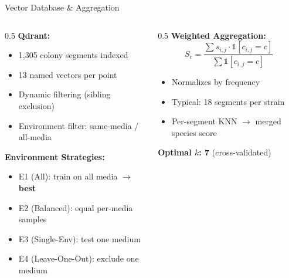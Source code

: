 \documentclass[aspectratio=169]{beamer}
\begin{document}
\begin{frame}{Vector Database \& Aggregation}
  \begin{columns}[T]
    \begin{column}{0.5\textwidth}
      \textbf{Qdrant:}
      \begin{itemize}
        \item 1,305 colony segments indexed
        \item 13 named vectors per point
        \item Dynamic filtering (sibling exclusion)
        \item Environment filter: same-media / all-media
      \end{itemize}

      \textbf{Environment Strategies:}
      \begin{itemize}
        \item E1 (All): train on all media $\rightarrow$ \textbf{best}
        \item E2 (Balanced): equal per-media samples
        \item E3 (Single-Env): test one medium
        \item E4 (Leave-One-Out): exclude one medium
      \end{itemize}
    \end{column}
    \begin{column}{0.5\textwidth}
      \textbf{Weighted Aggregation:}
      \[
      S_c = \frac{\sum s_{i,j} \cdot \mathbb{1}[c_{i,j}=c]}{\sum \mathbb{1}[c_{i,j}=c]}
      \]
      \begin{itemize}
        \item Normalizes by frequency
        \item Typical: 18 segments per strain
        \item Per-segment KNN $\rightarrow$ merged species score
      \end{itemize}

      \textbf{Optimal $k$: 7} (cross-validated)
    \end{column}
  \end{columns}
\end{frame}
\end{document}
